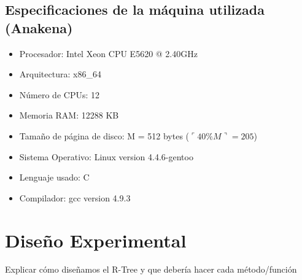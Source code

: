 \documentclass[letterpaper,10pt]{article}
\begin{document}
	\subsection*{Especificaciones de la máquina utilizada (Anakena)}

	\begin{itemize}
		\item Procesador: Intel \textregistered Xeon \textregistered CPU E5620 @ 2.40GHz
		\item Arquitectura: x86\_64
		\item Número de CPUs: 12
		\item Memoria RAM: 12288 KB
		\item Tamaño de página de disco: M = 512 bytes ($\ulcorner40\% M\urcorner = 205$)
		\item Sistema Operativo: Linux version 4.4.6-gentoo
		\item Lenguaje usado: C
		\item Compilador: gcc version 4.9.3
	\end{itemize}



	\pagebreak

	\section*{Diseño Experimental}

	Explicar cómo diseñamos el R-Tree y que debería hacer cada método/función

	\pagebreak
\end{document}
